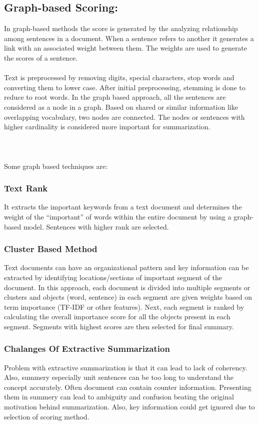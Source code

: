 \documentclass[conference]{IEEEtran}
\begin{document}
\subsection{Graph-based Scoring:}
In graph-based methods the score is generated by the analyzing relationship among sentences in a document. When a sentence refers to another it generates a link with an associated weight between them. The weights are used to generate the scores of a sentence.\\\\
Text is preprocessed by removing digits, special characters, stop words and converting them to lower case. After initial preprocessing, stemming is done to reduce to root words. In the graph based approach, all the sentences are considered as a node in a graph. Based on shared or similar information like overlapping vocabulary, two nodes are connected. The nodes or sentences with higher cardinality is considered more important for summarization.\\\\\\\\
Some graph based techniques are:\\
\subsubsection{Text Rank}
It extracts the important keywords from a text document and determines the weight of the “important” of words within the entire document by using a graph-based model. Sentences with higher rank are selected.
\subsubsection{Cluster Based Method}
Text documents can have an organizational pattern and key information can be extracted by identifying locations/sections of important segment of the document. In this approach, each document is divided into multiple segments or clusters and objects (word, sentence) in each segment are given weights based on term importance (TF-IDF or other features). Next, each segment is ranked by calculating the overall importance score for all the objects present in each segment. Segments with highest scores are then selected for final summary.
\subsubsection{Chalanges Of Extractive Summarization}
Problem with extractive summarization is that it can lead to lack of coherency. Also, summery especially unit sentences can be too long to understand the concept accurately. Often document can contain counter information. Presenting them in summery can lead to ambiguity and confusion beating the original motivation behind summarization.  Also, key information could get ignored due to selection of scoring method. 
\end{document}
